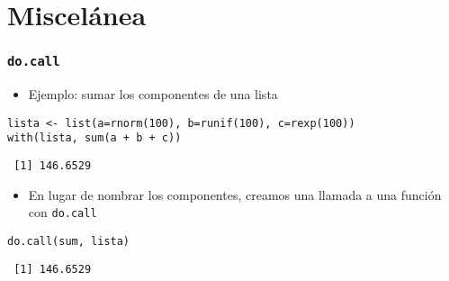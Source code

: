 \documentclass[xcolor={usenames,svgnames,dvipsnames}]{beamer}
\begin{document}
\section{Miscelánea}
\label{sec-4}
\begin{frame}[fragile]
\frametitle{\texttt{do.call}}
\label{sec-4-1}

\begin{itemize}
\item Ejemplo: sumar los componentes de una lista
\end{itemize}

\lstset{language=R}
\begin{lstlisting}
lista <- list(a=rnorm(100), b=runif(100), c=rexp(100))
with(lista, sum(a + b + c))
\end{lstlisting}

\begin{verbatim}
 [1] 146.6529
\end{verbatim}

\begin{itemize}
\item En lugar de nombrar los componentes, creamos una llamada a una
  función con \texttt{do.call}
\end{itemize}

\lstset{language=R}
\begin{lstlisting}
do.call(sum, lista)
\end{lstlisting}

\begin{verbatim}
 [1] 146.6529
\end{verbatim}
\end{frame}
\end{document}
